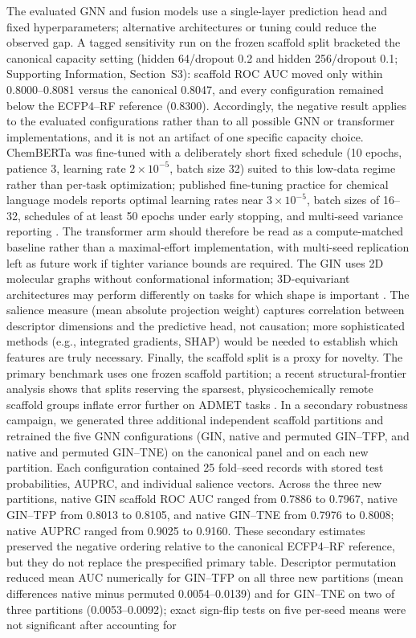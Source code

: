 \documentclass[11pt,a4paper]{article}
\begin{document}
The evaluated GNN and fusion models use a single-layer prediction head and fixed hyperparameters; alternative architectures or tuning could reduce the observed gap. A tagged sensitivity run on the frozen scaffold split bracketed the canonical capacity setting (hidden \num{64}/dropout \num{0.2} and hidden \num{256}/dropout \num{0.1}; Supporting Information, Section~S3): scaffold ROC AUC moved only within \num{0.8000}--\num{0.8081} versus the canonical \num{0.8047}, and every configuration remained below the ECFP4--RF reference (\num{0.8300}). Accordingly, the negative result applies to the evaluated configurations rather than to all possible GNN or transformer implementations, and it is not an artifact of one specific capacity choice. ChemBERTa was fine-tuned with a deliberately short fixed schedule (\num{10} epochs, patience \num{3}, learning rate $2\times 10^{-5}$, batch size \num{32}) suited to this low-data regime rather than per-task optimization; published fine-tuning practice for chemical language models reports optimal learning rates near $3\times 10^{-5}$, batch sizes of \num{16}--\num{32}, schedules of at least \num{50} epochs under early stopping, and multi-seed variance reporting \citep{chemberta3_2026}. The transformer arm should therefore be read as a compute-matched baseline rather than a maximal-effort implementation, with multi-seed replication left as future work if tighter variance bounds are required. The GIN uses 2D molecular graphs without conformational information; 3D-equivariant architectures may perform differently on tasks for which shape is important \citep{rollins2024molprop}. The salience measure (mean absolute projection weight) captures correlation between descriptor dimensions and the predictive head, not causation; more sophisticated methods (e.g., integrated gradients, SHAP) would be needed to establish which features are truly necessary. Finally, the scaffold split is a proxy for novelty. The primary benchmark uses one frozen scaffold partition; a recent structural-frontier analysis shows that splits reserving the sparsest, physicochemically remote scaffold groups inflate error further on ADMET tasks \citep{scaffold_frontier_2026}. In a secondary robustness campaign, we generated three additional independent scaffold partitions and retrained the five GNN configurations (GIN, native and permuted GIN--TFP, and native and permuted GIN--TNE) on the canonical panel and on each new partition. Each configuration contained 25 fold--seed records with stored test probabilities, AUPRC, and individual salience vectors. Across the three new partitions, native GIN scaffold ROC AUC ranged from \num{0.7886} to \num{0.7967}, native GIN--TFP from \num{0.8013} to \num{0.8105}, and native GIN--TNE from \num{0.7976} to \num{0.8008}; native AUPRC ranged from \num{0.9025} to \num{0.9160}. These secondary estimates preserved the negative ordering relative to the canonical ECFP4--RF reference, but they do not replace the prespecified primary table. Descriptor permutation reduced mean AUC numerically for GIN--TFP on all three new partitions (mean differences native minus permuted \num{0.0054}--\num{0.0139}) and for GIN--TNE on two of three partitions (\num{0.0053}--\num{0.0092}); exact sign-flip tests on five per-seed means were not significant after accounting for 
\end{document}
